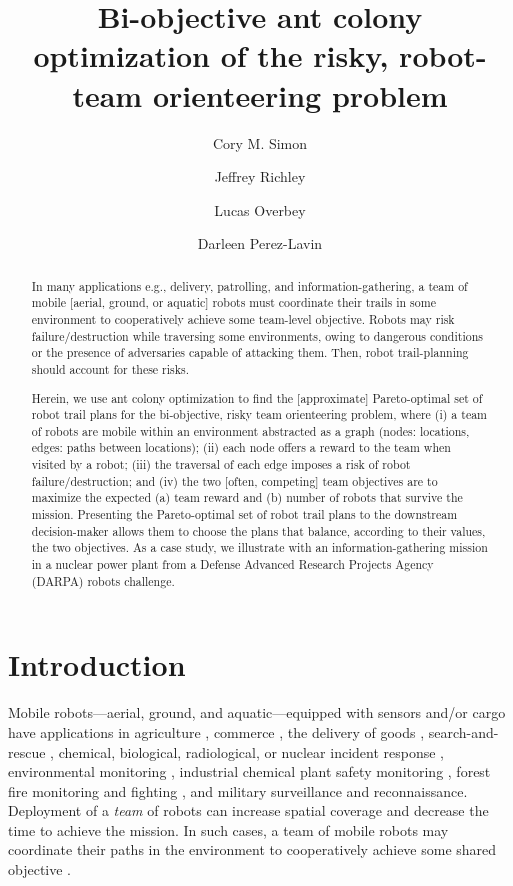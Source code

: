 \documentclass[11pt, oneside]{article}
\title{Bi-objective ant colony optimization of the risky, robot-team orienteering problem}
\author[1]{Cory M. Simon}
\author[2]{Jeffrey Richley}
\author[2]{Lucas Overbey}
\author[2]{Darleen Perez-Lavin}
\affil[1]{School of Chemical, Biological, and Environmental Engineering. Oregon State University. Corvallis, OR. USA.}
\affil[2]{Naval Information Warfare Center Atlantic. Charleston, SC. USA.}
\begin{document}
\maketitle

\begin{abstract}
In many applications e.g., delivery, patrolling, and information-gathering, a team of mobile [aerial, ground, or aquatic] robots must coordinate their trails in some environment to cooperatively achieve some team-level objective. 
Robots may risk failure/destruction while traversing some environments, owing to dangerous conditions or the presence of adversaries capable of attacking them. 
Then, robot trail-planning should account for these risks.

Herein, we use ant colony optimization to find the [approximate] Pareto-optimal set of robot trail plans for the bi-objective, risky team orienteering problem, where (i) a team of robots are mobile within an environment abstracted as a graph (nodes: locations, edges: paths between locations); (ii) each node offers a reward to the team when visited by a robot; (iii) the traversal of each edge imposes a risk of robot failure/destruction; and (iv) the two [often, competing] team objectives are to maximize the expected (a) team reward and (b) number of robots that survive the mission.
Presenting the Pareto-optimal set of robot trail plans to the downstream decision-maker allows them to choose the plans that balance, according to their values, the two objectives. 
As a case study, we illustrate with an information-gathering mission in a nuclear power plant from a Defense Advanced Research Projects Agency (DARPA) robots challenge.
\end{abstract}

\clearpage

\section{Introduction}
Mobile robots---aerial, ground, and aquatic---equipped with sensors and/or cargo have applications in agriculture \cite{santos2020path}, commerce \cite{bogue2016growth}, the delivery of goods \cite{coelho2014thirty}, search-and-rescue \cite{queralta2020collaborative}, chemical, biological, radiological, or nuclear incident response \cite{murphy2012projected}, environmental monitoring \cite{dunbabin2012robots}, industrial chemical plant safety monitoring \cite{soldan2014towards}, forest fire monitoring and fighting \cite{merino2012unmanned}, and military surveillance and reconnaissance. 
Deployment of a \emph{team} of robots can increase spatial coverage and decrease the time to achieve the mission. 
In such cases, a team of mobile robots may coordinate their paths in the environment to cooperatively achieve some shared objective \cite{parker2007distributed}.
\end{document}
